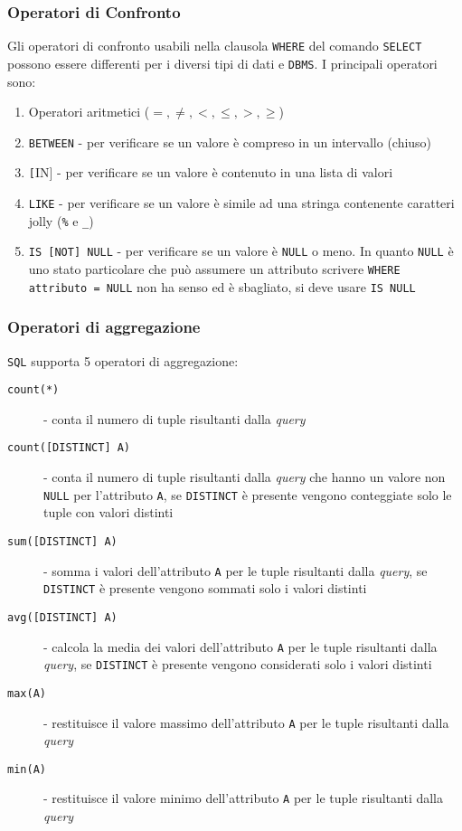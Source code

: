         \subsubsection{Operatori di Confronto} 
            Gli operatori di confronto usabili nella clausola \texttt{WHERE} del comando \texttt{SELECT} possono essere differenti per i diversi tipi di dati e \texttt{DBMS}. I principali operatori sono:
                \begin{enumerate}
                    \item Operatori aritmetici ($=, \neq, <, \leq, >, \geq$)
                    \item \texttt{BETWEEN} - per verificare se un valore è compreso in un intervallo (chiuso)
                    \item \texttt[IN] - per verificare se un valore è contenuto in una lista di valori
                    \item \texttt{LIKE} - per verificare se un valore è simile ad una stringa contenente caratteri jolly (\texttt{\%} e \texttt{\_})
                    \item \texttt{IS [NOT] NULL} - per verificare se un valore è \texttt{NULL} o meno. In quanto \texttt{NULL} è uno stato particolare che può assumere un attributo scrivere \texttt{WHERE attributo = NULL} non ha senso ed è sbagliato, si deve usare \texttt{IS NULL}
                \end{enumerate}
        \subsubsection{Operatori di aggregazione}
            \texttt{SQL} supporta 5 operatori di aggregazione:
            \begin{description}
                \item[\texttt{count(*)}] - conta il numero di tuple risultanti dalla \textit{query}
                \item[\texttt{count([DISTINCT] A)}] - conta il numero di tuple risultanti dalla \textit{query} che hanno un valore non \texttt{NULL} per l'attributo \texttt{A}, se \texttt{DISTINCT} è presente vengono conteggiate solo le tuple con valori distinti
                \item[\texttt{sum([DISTINCT] A)}] - somma i valori dell'attributo \texttt{A} per le tuple risultanti dalla \textit{query}, se \texttt{DISTINCT} è presente vengono sommati solo i valori distinti
                \item[\texttt{avg([DISTINCT] A)}] - calcola la media dei valori dell'attributo \texttt{A} per le tuple risultanti dalla \textit{query}, se \texttt{DISTINCT} è presente vengono considerati solo i valori distinti
                \item[\texttt{max(A)}] - restituisce il valore massimo dell'attributo \texttt{A} per le tuple risultanti dalla \textit{query}
                \item[\texttt{min(A)}] - restituisce il valore minimo dell'attributo \texttt{A} per le tuple risultanti dalla \textit{query}
            \end{description}
